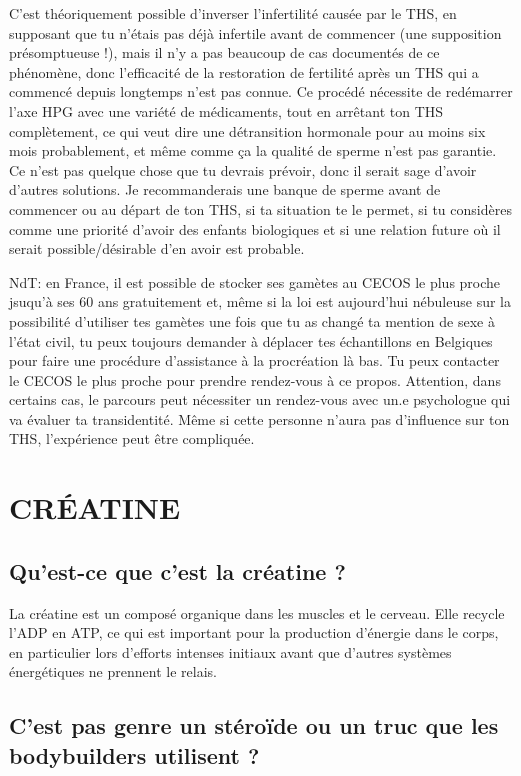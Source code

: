 \documentclass{article}
\begin{document}
C'est théoriquement possible d'inverser l'infertilité causée par le THS, en supposant que tu n'étais pas déjà infertile avant de commencer (une supposition présomptueuse !), mais il n'y a pas beaucoup de cas documentés de ce phénomène, donc l'efficacité de la restoration de fertilité après un THS qui a commencé depuis longtemps n'est pas connue. Ce procédé nécessite de redémarrer l'axe HPG avec une variété de médicaments, tout en arrêtant ton THS complètement, ce qui veut dire une détransition hormonale pour au moins six mois probablement, et même comme ça la qualité de sperme n'est pas garantie. Ce n'est pas quelque chose que tu devrais prévoir, donc il serait sage d'avoir d'autres solutions. Je recommanderais une banque de sperme avant de commencer ou au départ de ton THS, si ta situation te le permet, si tu considères comme une priorité d'avoir des enfants biologiques et si une relation future où il serait possible/désirable d'en avoir est probable.  

NdT: en France, il est possible de stocker ses gamètes au CECOS le plus proche jsuqu'à ses 60 ans gratuitement et, même si la loi est aujourd'hui nébuleuse sur la possibilité d'utiliser tes gamètes une fois que tu as changé ta mention de sexe à l'état civil, tu peux toujours demander à déplacer tes échantillons en Belgiques pour faire une procédure d'assistance à la procréation là bas. Tu peux contacter le CECOS le plus proche pour prendre rendez-vous à ce propos. Attention, dans certains cas, le parcours peut nécessiter un rendez-vous avec un.e psychologue qui va évaluer ta transidentité. Même si cette personne n'aura pas d'influence sur ton THS, l'expérience peut être compliquée.

\section{CRÉATINE}

\subsection{Qu'est-ce que c'est la créatine ?}

La créatine est un composé organique dans les muscles et le cerveau. Elle recycle l'ADP en ATP, ce qui est important pour la production d'énergie dans le corps, en particulier lors d'efforts intenses initiaux avant que d'autres systèmes énergétiques ne prennent le relais. 

\subsection{C'est pas genre un stéroïde ou un truc que les bodybuilders utilisent ?}
\end{document}

